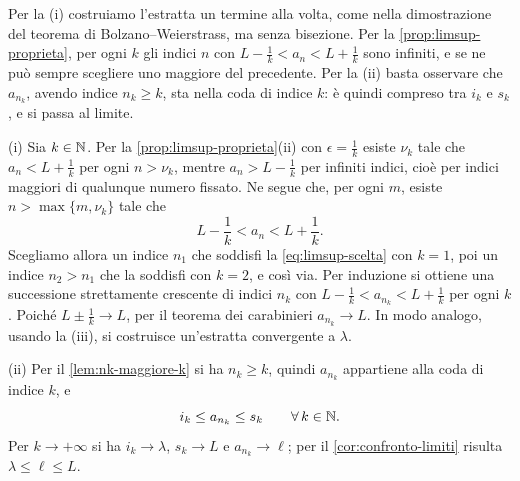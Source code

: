 \begin{schema}
\end{schema}

\begin{strategia}
Per la (i) costruiamo l'estratta un termine alla volta, come nella dimostrazione del
teorema di Bolzano--Weierstrass, ma senza bisezione. Per la
\cref{prop:limsup-proprieta}, per ogni $k$ gli indici $n$ con
$L-\frac1k<a_{n}<L+\frac1k$ sono infiniti, e se ne può sempre scegliere uno maggiore del
precedente. Per la (ii) basta osservare che $a_{n_{k}}$, avendo indice $n_{k}\ge k$, sta
nella coda di indice $k$: è quindi compreso tra $i_{k}$ e $s_{k}$, e si passa al limite.
\end{strategia}

\begin{dimostrazione}
(i) Sia $k\in\mathbb{N}$. Per la \cref{prop:limsup-proprieta}(ii) con $\epsilon=\frac1k$ esiste
$\nu_{k}$ tale che $a_{n}<L+\frac1k$ per ogni $n>\nu_{k}$, mentre $a_{n}>L-\frac1k$ per
infiniti indici, cioè per indici maggiori di qualunque numero fissato. Ne segue che, per
ogni $m$, esiste $n>\max\{m,\nu_{k}\}$ tale che
\begin{equation}\label{eq:limsup-scelta}
  L-\frac1k<a_{n}<L+\frac1k .
\end{equation}
Scegliamo allora un indice $n_{1}$ che soddisfi la \eqref{eq:limsup-scelta} con $k=1$,
poi un indice $n_{2}>n_{1}$ che la soddisfi con $k=2$, e così via. Per induzione si
ottiene una successione strettamente crescente di indici $n_{k}$ con
$L-\frac1k<a_{n_{k}}<L+\frac1k$ per ogni $k$. Poiché $L\pm\frac1k\to L$, per il teorema
dei carabinieri $a_{n_{k}}\to L$. In modo analogo, usando la (iii), si costruisce
un'estratta convergente a $\lambda$.

(ii) Per il \cref{lem:nk-maggiore-k} si ha $n_{k}\ge k$, quindi $a_{n_{k}}$ appartiene
alla coda di indice $k$, e
\[
  i_{k}\le a_{n_{k}}\le s_{k} \qquad\forall\, k\in\mathbb{N} .
\]
Per $k\to+\infty$ si ha $i_{k}\to\lambda$, $s_{k}\to L$ e $a_{n_{k}}\to\ell$; per il
\cref{cor:confronto-limiti} risulta $\lambda\le\ell\le L$.
\end{dimostrazione}

